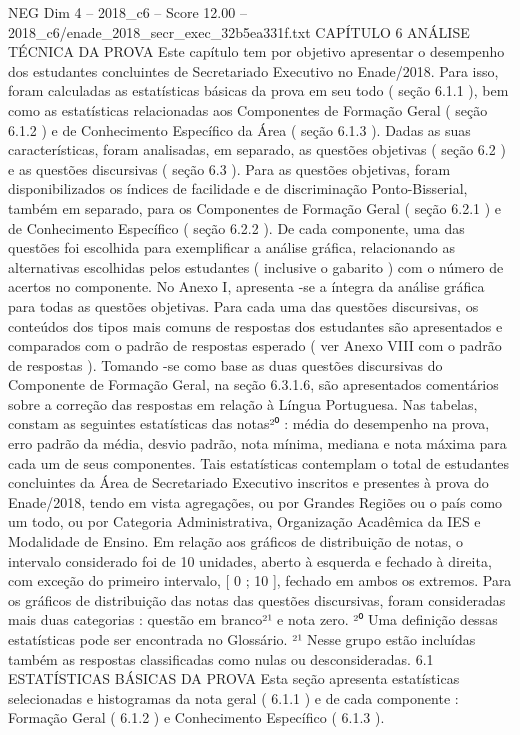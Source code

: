 \begin{textsample}{NEG Dim 4 – 2018\_c6 – Score 12.00 – 2018\_c6/enade\_2018\_secr\_exec\_32b5ea331f.txt}  \label{ex:f4_neg_339}
CAPÍTULO 6 ANÁLISE TÉCNICA DA PROVA Este capítulo tem por objetivo apresentar o desempenho dos estudantes concluintes de Secretariado Executivo no Enade/2018.
Para isso, foram calculadas as estatísticas básicas da prova em seu todo ( seção 6.1.1 ), bem como as estatísticas relacionadas aos Componentes de Formação Geral ( seção 6.1.2 ) e de Conhecimento Específico da Área ( seção 6.1.3 ).
Dadas as suas características, foram analisadas, em separado, as questões objetivas ( seção 6.2 ) e as questões discursivas ( seção 6.3 ).
Para as questões objetivas, foram disponibilizados os índices de facilidade e de discriminação Ponto-Bisserial, também em separado, para os Componentes de Formação Geral ( seção 6.2.1 ) e de Conhecimento Específico ( seção 6.2.2 ).
De cada componente, uma das questões foi escolhida para exemplificar a análise gráfica, relacionando as alternativas escolhidas pelos estudantes ( inclusive o gabarito ) com o número de acertos no componente.
No Anexo I, apresenta -se a íntegra da análise gráfica para todas as questões objetivas.
Para cada uma das questões discursivas, os conteúdos dos tipos mais comuns de respostas dos estudantes são apresentados e comparados com o padrão de respostas esperado ( ver Anexo VIII com o padrão de respostas ).
Tomando -se como base as duas questões discursivas do Componente de Formação Geral, na seção 6.3.1.6, são apresentados comentários sobre a correção das respostas em relação à Língua Portuguesa.
Nas tabelas, constam as seguintes estatísticas das notas²⁰ : média do desempenho na prova, erro padrão da média, desvio padrão, nota mínima, mediana e nota máxima para cada um de seus componentes.
Tais estatísticas contemplam o total de estudantes concluintes da Área de Secretariado Executivo inscritos e presentes à prova do Enade/2018, tendo em vista agregações, ou por Grandes Regiões ou o país como um todo, ou por Categoria Administrativa, Organização Acadêmica da IES e Modalidade de Ensino.
Em relação aos gráficos de distribuição de notas, o intervalo considerado foi de 10 unidades, aberto à esquerda e fechado à direita, com exceção do primeiro intervalo, [ 0 ; 10 ], fechado em ambos os extremos.
Para os gráficos de distribuição das notas das questões discursivas, foram consideradas mais duas categorias : questão em branco²¹ e nota zero. ²⁰ Uma definição dessas estatísticas pode ser encontrada no Glossário. ²¹ Nesse grupo estão incluídas também as respostas classificadas como nulas ou desconsideradas. 6.1 ESTATÍSTICAS BÁSICAS DA PROVA Esta seção apresenta estatísticas selecionadas e histogramas da nota geral ( 6.1.1 ) e de cada componente : Formação Geral ( 6.1.2 ) e Conhecimento Específico ( 6.1.3 ).

\end{textsample}
